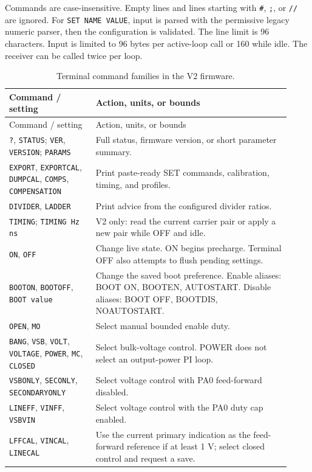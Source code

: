 Commands are case-insensitive. Empty lines and lines starting with \texttt{\#}, \texttt{;}, or \texttt{//} are ignored. For \texttt{SET NAME VALUE}, input is parsed with the permissive legacy numeric parser, then the configuration is validated. The line limit is 96 characters. Input is limited to 96 bytes per active-loop call or 160 while idle. The receiver can be called twice per loop.
\begingroup
\small
\begin{longtable}{@{}L{0.29\linewidth}L{0.63\linewidth}@{}}
\caption{Terminal command families in the V2 firmware.}\label{tab:app-fw-uart-packet}\\
\toprule Command / setting & Action, units, or bounds\\\midrule
\endfirsthead
\toprule Command / setting & Action, units, or bounds\\\midrule
\endhead
\texttt{?}, \texttt{STATUS}; \texttt{VER}, \texttt{VERSION}; \texttt{PARAMS} & Full status, firmware version, or short parameter summary.\\
\texttt{EXPORT}, \texttt{EXPORTCAL}, \texttt{DUMPCAL}, \texttt{COMPS}, \texttt{COMPENSATION} & Print paste-ready SET commands, calibration, timing, and profiles.\\
\texttt{DIVIDER}, \texttt{LADDER} & Print advice from the configured divider ratios.\\
\texttt{TIMING}; \texttt{TIMING Hz ns} & V2 only: read the current carrier pair or apply a new pair while OFF and idle.\\
\texttt{ON}, \texttt{OFF} & Change live state. ON begins precharge. Terminal OFF also attempts to flush pending settings.\\
\texttt{BOOTON}, \texttt{BOOTOFF}, \texttt{BOOT value} & Change the saved boot preference. Enable aliases: BOOT ON, BOOTEN, AUTOSTART. Disable aliases: BOOT OFF, BOOTDIS, NOAUTOSTART.\\
\texttt{OPEN}, \texttt{MO} & Select manual bounded enable duty.\\
\texttt{BANG}, \texttt{VSB}, \texttt{VOLT}, \texttt{VOLTAGE}, \texttt{POWER}, \texttt{MC}, \texttt{CLOSED} & Select bulk-voltage control. POWER does not select an output-power PI loop.\\
\texttt{VSBONLY}, \texttt{SECONLY}, \texttt{SECONDARYONLY} & Select voltage control with PA0 feed-forward disabled.\\
\texttt{LINEFF}, \texttt{VINFF}, \texttt{VSBVIN} & Select voltage control with the PA0 duty cap enabled.\\
\texttt{LFFCAL}, \texttt{VINCAL}, \texttt{LINECAL} & Use the current primary indication as the feed-forward reference if at least 1 V; select closed control and request a save.\\

\end{longtable}
